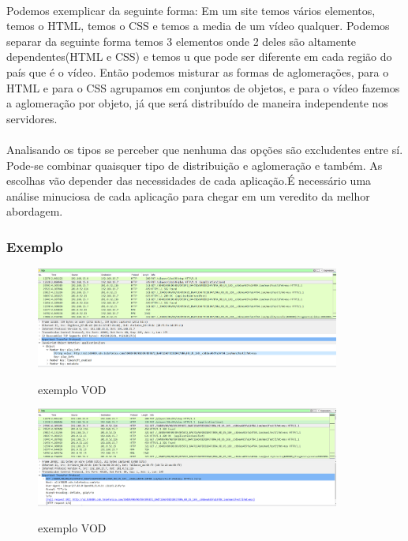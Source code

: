 \paragraph{} Podemos exemplicar da seguinte forma: Em um site temos v\'arios elementos, temos o HTML, temos o CSS e temos a media de um v\'ideo qualquer. Podemos separar da seguinte forma temos 3 elementos onde 2 deles s\~ao altamente dependentes(HTML e CSS) e temos u que pode ser diferente em cada regi\~ao do pa\'is que \'e o v\'ideo. Ent\~ao podemos misturar as formas de aglomera\c{c}\~oes, para o HTML e para o CSS agrupamos em conjuntos de objetos, e para o v\'ideo fazemos a aglomera\c{c}\~ao por objeto, j\'a que ser\'a distribu\'ido de maneira independente nos servidores.

\paragraph{} Analisando os tipos se perceber que nenhuma das op\c{c}\~oes s\~ao excludentes entre s\'i. Pode-se combinar quaisquer tipo de distribui\c{c}\~ao e aglomera\c{c}\~ao e tamb\'em. As escolhas v\~ao depender das necessidades de cada aplica\c{c}\~ao.\'E necess\'ario uma an\'alise minuciosa de cada aplica\c{c}\~ao para chegar em um veredito da melhor abordagem.
\subsubsection{Exemplo}

\begin{figure}[h]
\caption{exemplo VOD}
\includegraphics[width=10cm]{Figuras/exemplo_vod_1.png} 
\label{figura:exemplo_vod_1}
\end{figure}

\begin{figure}[h]
\caption{exemplo VOD}
\includegraphics[width=10cm]{Figuras/exemplo_vod_2.png} 
\label{figura:exemplo_vod_2}
\end{figure}

